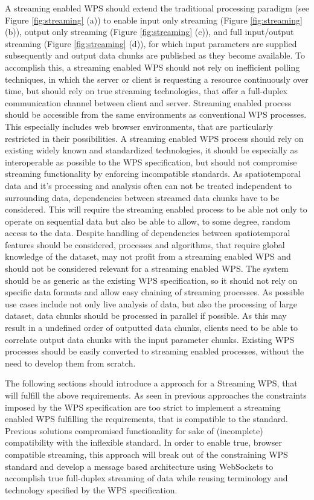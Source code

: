 	A streaming enabled \ac{WPS} should extend the traditional processing paradigm (see Figure \ref{fig:streaming} (a)) to enable input only streaming (Figure \ref{fig:streaming} (b)), output only streaming (Figure \ref{fig:streaming} (c)), and full input/output streaming (Figure \ref{fig:streaming} (d)), for which input parameters are supplied subsequently and output data chunks are published as they become available. To accomplish this, a streaming enabled \ac{WPS} should not rely on inefficient polling techniques, in which the server or client is requesting a resource continuously over time, but should rely on true streaming technologies, that offer a full-duplex communication channel between client and server. Streaming enabled process should be accessible from the same environments as conventional \ac{WPS} processes. This especially includes web browser environments, that are particularly restricted in their possibilities. A streaming enabled \ac{WPS} process should rely on existing widely known and standardized technologies, it should be especially as interoperable as possible to the \ac{WPS} specification, but should not compromise streaming functionality by enforcing incompatible standards. As spatiotemporal data and it's processing and analysis often can not be treated independent to surrounding data, dependencies between streamed data chunks have to be considered. This will require the streaming enabled process to be able not only to operate on sequential data but also be able to allow, to some degree, random access to the data. Despite handling of dependencies between spatiotemporal features should be considered, processes and algorithms, that require global knowledge of the dataset, may not profit from a streaming enabled WPS and should not be considered relevant for a streaming enabled \ac{WPS}. The system should be as generic as the existing \ac{WPS} specification, so it should not rely on specific data formats and allow easy chaining of streaming processes. As possible use cases include not only live analysis of data, but also the processing of large dataset, data chunks should be processed in parallel if possible. As this may result in a undefined order of outputted data chunks, clients need to be able to correlate output data chunks with the input parameter chunks. Existing \ac{WPS} processes should be easily converted to streaming enabled processes, without the need to develop them from scratch.

	The following sections should introduce a approach for a Streaming \ac{WPS}, that will fulfill the above requirements. As seen in previous approaches the constraints imposed by the \ac{WPS} specification are too strict to implement a streaming enabled WPS fulfilling the requirements, that is compatible to the standard. Previous solutions compromised functionality for sake of (incomplete) compatibility with the inflexible standard. In order to enable true, browser compatible streaming, this approach will break out of the constraining \ac{WPS} standard and develop a message based architecture using WebSockets to accomplish true full-duplex streaming of data while reusing terminology and technology specified by the \ac{WPS} specification.

